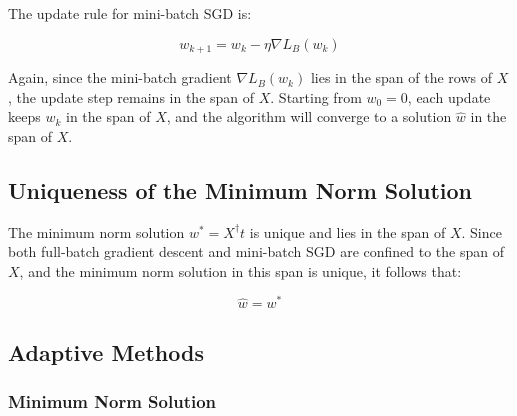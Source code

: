 The update rule for mini-batch SGD is:

\[
w_{k+1} = w_k - \eta \nabla L_B(w_k)
\]

Again, since the mini-batch gradient \( \nabla L_B(w_k) \) lies in the span of the rows of \( X \), the update step remains in the span of \( X \). Starting from \( w_0 = 0 \), each update keeps \( w_k \) in the span of \( X \), and the algorithm will converge to a solution \( \hat{w} \) in the span of \( X \).

\subsection*{Uniqueness of the Minimum Norm Solution}

The minimum norm solution \( w^* = X^{\dagger} t \) is unique and lies in the span of \( X \). Since both full-batch gradient descent and mini-batch SGD are confined to the span of \( X \), and the minimum norm solution in this span is unique, it follows that:

\[
\hat{w} = w^*
\]
\subsection{Adaptive Methods}
\subsubsection{Minimum Norm Solution}

